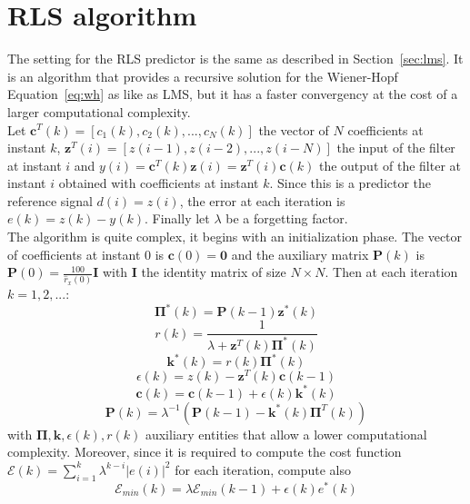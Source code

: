 \documentclass[10pt]{article}
\numberwithin{equation}{section}
\begin{document}
\section{RLS algorithm}
The setting for the RLS predictor is the same as described in Section~\ref{sec:lms}. It is an algorithm that provides a recursive solution for the Wiener-Hopf Equation~\ref{eq:wh} as like as LMS, but it has a faster convergency at the cost of a larger computational complexity. \\
Let $\mathbf{c}^T(k) = [c_1(k), c_2(k), ..., c_N(k)]$ the vector of $N$ coefficients at instant $k$, $\mathbf{z}^T(i) = [z(i-1), z(i-2), ..., z(i-N)]$ the input of the filter at instant $i$ and $y(i) = \mathbf{c}^T(k)\mathbf{z}(i) = \mathbf{z}^T(i)\mathbf{c}(k)$ the output of the filter at instant $i$ obtained with coefficients at instant $k$. Since this is a predictor the reference signal $d(i) = z(i)$, the error at each iteration is $e(k) = z(k) - y(k)$. Finally let $\lambda$ be a forgetting factor.\\
The algorithm is quite complex, it begins with an initialization phase. The vector of coefficients at instant $0$ is $\mathbf{c}(0) = \mathbf{0}$ and the auxiliary matrix $\mathbf{P}(k)$ is $\mathbf{P}(0) = \frac{100}{\hat{r}_x(0)} \mathbf{I}$ with $\mathbf{I}$ the identity matrix of size $N\times N$. Then at each iteration $k = 1, 2, ...$:
\begin{equation}
  \mathbf{\Pi}^*(k) = \mathbf{P}(k-1)\mathbf{z}^*(k)
\end{equation}
\begin{equation}
  r(k) = \frac{1}{\lambda + \mathbf{z}^T(k)\mathbf{\Pi}^*(k)}
\end{equation}
\begin{equation}
  \mathbf{k}^*(k) = r(k)\mathbf{\Pi}^*(k)
\end{equation}
\begin{equation}
  \epsilon(k) = z(k) - \mathbf{z}^T(k)\mathbf{c}(k-1)
\end{equation}
\begin{equation}
  \mathbf{c}(k) = \mathbf{c}(k-1) + \epsilon(k)\mathbf{k}^*(k)
\end{equation}
\begin{equation}
  \mathbf{P}(k) = \lambda^{-1}(\mathbf{P}(k-1) - \mathbf{k}^*(k)\mathbf{\Pi}^T(k))
\end{equation}
with $\mathbf{\Pi}, \mathbf{k}, \epsilon(k), r(k)$ auxiliary entities that allow a lower computational complexity. Moreover, since it is required to compute the cost function $\mathcal{E}(k) = \sum_{i=1}^k \lambda^{k-i} |e(i)|^2$ for each iteration, compute also
\begin{equation}
  \mathcal{E}_{min}(k) = \lambda \mathcal{E}_{min}(k-1) + \epsilon(k)e^*(k)
\end{equation}
\end{document}
